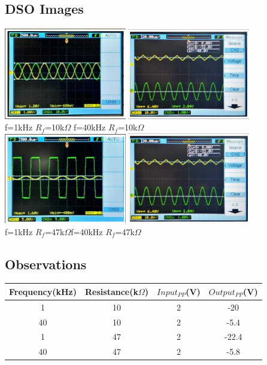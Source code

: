 \documentclass{article}
\begin{document}
\subsection{DSO Images}
\begin{center}
    \includegraphics[width=0.4\textwidth]{i8.png}
    \includegraphics[width=0.4\textwidth]{i9.png}\\
    f=1kHz  $R_{f}$=10k$\Omega$ \hspace{20mm}f=40kHz  $R_{f}$=10k$\Omega$\\
    \includegraphics[width=0.4\textwidth]{i16.png}
    \includegraphics[width=0.4\textwidth]{i17.png}\\
    f=1kHz  $R_{f}$=47k$\Omega$\hspace{20mm}f=40kHz  $R_{f}$=47k$\Omega$\\
\end{center}
\subsection{Observations}
\begin{center}
\begin{tabular}{|c|c|c|c|}
\hline
    Frequency(kHz) & Resistance(k$\Omega$) & $Input_{PP}$(V) & $Output_{PP}$(V)\\
    \hline
    1 & 10 & 2 & -20\\
    40 & 10 & 2 & -5.4 \\
    1 & 47 & 2 & -22.4\\
    40 & 47 & 2 & -5.8\\
\hline
\end{tabular}
\end{center}
\end{document}
